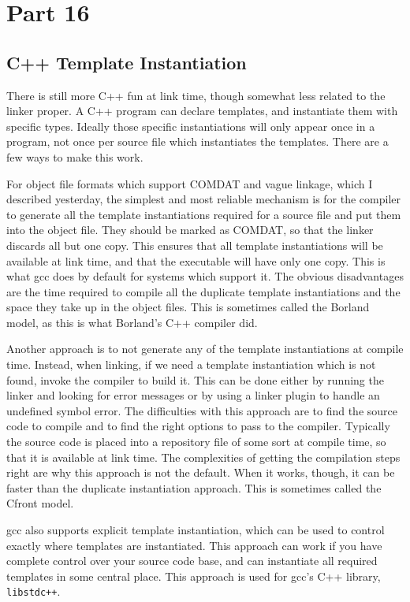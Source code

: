 \section{Part 16}

\subsection{C++ Template Instantiation}

There is still more C++ fun at link time, though somewhat less related to the
linker proper. A C++ program can declare templates, and instantiate them with
specific types. Ideally those specific instantiations will only appear once in
a program, not once per source file which instantiates the templates. There are
a few ways to make this work.

For object file formats which support COMDAT and vague linkage, which I
described yesterday, the simplest and most reliable mechanism is for the
compiler to generate all the template instantiations required for a source file
and put them into the object file. They should be marked as COMDAT, so that the
linker discards all but one copy. This ensures that all template instantiations
will be available at link time, and that the executable will have only one
copy. This is what gcc does by default for systems which support it. The
obvious disadvantages are the time required to compile all the duplicate
template instantiations and the space they take up in the object files. This is
sometimes called the Borland model, as this is what Borland's C++ compiler did.

Another approach is to not generate any of the template instantiations at
compile time. Instead, when linking, if we need a template instantiation which
is not found, invoke the compiler to build it. This can be done either by
running the linker and looking for error messages or by using a linker plugin
to handle an undefined symbol error. The difficulties with this approach are to
find the source code to compile and to find the right options to pass to the
compiler. Typically the source code is placed into a repository file of some
sort at compile time, so that it is available at link time. The complexities of
getting the compilation steps right are why this approach is not the default.
When it works, though, it can be faster than the duplicate instantiation
approach. This is sometimes called the Cfront model.

gcc also supports explicit template instantiation, which can be used to control
exactly where templates are instantiated. This approach can work if you have
complete control over your source code base, and can instantiate all required
templates in some central place. This approach is used for gcc's C++ library,
\texttt{libstdc++}.

